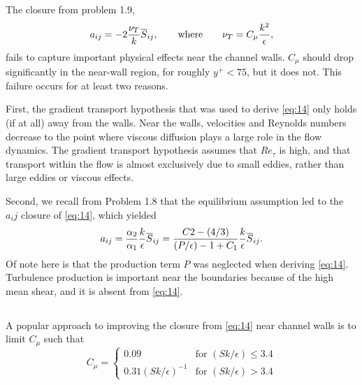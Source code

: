 \documentclass[11pt]{article}
\begin{document}
\subsection{}

The closure from problem 1.9,
\begin{equation}
a_{ij} =
-2 \frac{\nu_T}{k} \overline{S}_{ij}
,
\qquad
\text{where}
\qquad
\nu_T =
C_\mu \frac{k^2}{\epsilon}
,
\label{eq:14}
\end{equation}
fails to capture important physical effects near the channel walls. $C_\mu$ should drop significantly in the near-wall region, for roughly $y^+ < 75$, but it does not. This failure occurs for at least two reasons.

First, the gradient transport hypothesis that was used to derive \eqref{eq:14} only holds (if at all) away from the walls. Near the walls, velocities and Reynolds numbers decrease to the point where viscous diffusion plays a large role in the flow dynamics. The gradient transport hypothesis assumes that $Re_\tau$ is high, and that transport within the flow is almost exclusively due to small eddies, rather than large eddies or viscous effects.

Second, we recall from Problem 1.8 that the equilibrium assumption led to the $a_ij$ closure of \eqref{eq:14}, which yielded
\begin{equation}
a_{ij} =
\frac{\alpha_2}{\alpha_1} \frac{k}{\epsilon} \overline{S}_{ij} =
\frac{C2-(4/3)}{(P/\epsilon)-1+C_1} \frac{k}{\epsilon} \overline{S}_{ij}
.
\end{equation}
Of note here is that the production term $P$ was neglected when deriving \eqref{eq:14}. Turbulence production is important near the boundaries because of the high mean shear, and it is absent from \eqref{eq:14}.

\subsection{}

A popular approach to improving the closure from \eqref{eq:14} near channel walls is to limit $C_\mu$ such that
\begin{equation}
C_\mu =
\begin{cases}
0.09 &\text{for $(Sk/\epsilon) \le 3.4$} \\
0.31(Sk/\epsilon)^{-1} &\text{for $(Sk/\epsilon) > 3.4$}
\end{cases}
\end{equation}
\end{document}

